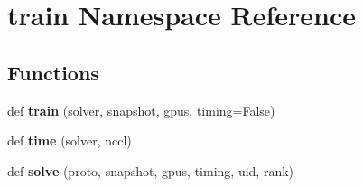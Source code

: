 \hypertarget{namespacetrain}{}\section{train Namespace Reference}
\label{namespacetrain}
\subsection*{Functions}
\begin{DoxyCompactItemize}
\item 
\mbox{\label{namespacetrain_afe4004eb13588d934b674119beb87d1c}} 
def {\bfseries train} (solver, snapshot, gpus, timing=False)
\item 
\mbox{\label{namespacetrain_a0ade729ddf0a492ed0c471b5e28074db}} 
def {\bfseries time} (solver, nccl)
\item 
\mbox{\label{namespacetrain_a4b2236e69eaf68ca675f8c11e5280fd3}} 
def {\bfseries solve} (proto, snapshot, gpus, timing, uid, rank)
\end{DoxyCompactItemize}
